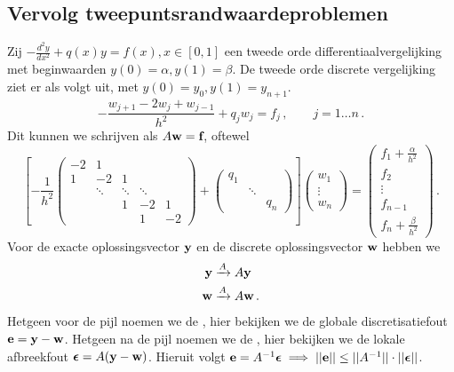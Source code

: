 \documentclass{2wn20summary}
\begin{document}
		\subsection{Vervolg tweepuntsrandwaardeproblemen}
			Zij $ -\frac{d^2 y}{dx^2} + q(x)y = f(x), x\in [0,1]$ een tweede orde differentiaalvergelijking met beginwaarden $ y(0)=\alpha, y(1)=\beta $. De tweede orde discrete vergelijking ziet er als volgt uit, met $ y(0) = y_0, y(1) = y_{n+1} $.
			\[ 
				-\frac{w_{j+1}-2w_j+w_{j-1}}{h^2} + q_j w_j = f_j\,, \qquad j=1\dots n\,.
			\]
			Dit kunnen we schrijven als $ A{\textbf{w}} = {\textbf{f}} $, oftewel 
			\[
				\left[ -\frac{1}{h^2} \begin{pmatrix}
					-2 & 1 & & &\\
					1 & -2 & 1 & & \\
					& \ddots & \ddots & \ddots & \\
					& & 1 & -2 & 1 \\
					& & & 1 & -2  
				\end{pmatrix} + \begin{pmatrix}
					q_1 & & \\
					& \ddots & \\
					& & q_n
				\end{pmatrix} \right] \begin{pmatrix}
					w _1 \\
					\vdots \\
					w_n
				\end{pmatrix} = \begin{pmatrix}
					f_1 + \frac{\alpha}{h^2} \\
					f_2 \\
					\vdots \\
					f_{n-1} \\
					f_n + \frac{\beta}{h^2}
				\end{pmatrix}\,.
			\]
			Voor de exacte oplossingsvector ${\textbf{y}}$ en de discrete oplossingsvector ${\textbf{w}}$ hebben we 
			\begin{align*}
				{\textbf{y}} &\xrightarrow{A} A{\textbf{y}} \\
				{\textbf{w}} &\xrightarrow{A} A{\textbf{w}}\,.
			\end{align*}
			Hetgeen voor de pijl noemen we de , hier bekijken we de globale discretisatiefout $ {\textbf{e}} = {\textbf{y}} - {\textbf{w}} $. Hetgeen na de pijl noemen we de , hier bekijken we de lokale afbreekfout $ \bep = A(\y -\w) $. Hieruit volgt $ \e = A^{-1}\bep \implies ||\e|| \le ||A^{-1}||\cdot||\bep||$.
		
\end{document}
